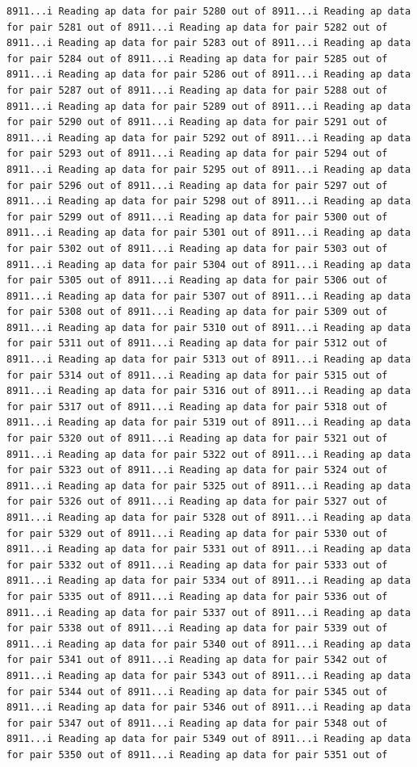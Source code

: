 \documentclass[
]{article}
\begin{document}
\begin{verbatim}
8911...i Reading ap data for pair 5280 out of 8911...i Reading ap data for pair 5281 out of 8911...i Reading ap data for pair 5282 out of 8911...i Reading ap data for pair 5283 out of 8911...i Reading ap data for pair 5284 out of 8911...i Reading ap data for pair 5285 out of 8911...i Reading ap data for pair 5286 out of 8911...i Reading ap data for pair 5287 out of 8911...i Reading ap data for pair 5288 out of 8911...i Reading ap data for pair 5289 out of 8911...i Reading ap data for pair 5290 out of 8911...i Reading ap data for pair 5291 out of 8911...i Reading ap data for pair 5292 out of 8911...i Reading ap data for pair 5293 out of 8911...i Reading ap data for pair 5294 out of 8911...i Reading ap data for pair 5295 out of 8911...i Reading ap data for pair 5296 out of 8911...i Reading ap data for pair 5297 out of 8911...i Reading ap data for pair 5298 out of 8911...i Reading ap data for pair 5299 out of 8911...i Reading ap data for pair 5300 out of 8911...i Reading ap data for pair 5301 out of 8911...i Reading ap data for pair 5302 out of 8911...i Reading ap data for pair 5303 out of 8911...i Reading ap data for pair 5304 out of 8911...i Reading ap data for pair 5305 out of 8911...i Reading ap data for pair 5306 out of 8911...i Reading ap data for pair 5307 out of 8911...i Reading ap data for pair 5308 out of 8911...i Reading ap data for pair 5309 out of 8911...i Reading ap data for pair 5310 out of 8911...i Reading ap data for pair 5311 out of 8911...i Reading ap data for pair 5312 out of 8911...i Reading ap data for pair 5313 out of 8911...i Reading ap data for pair 5314 out of 8911...i Reading ap data for pair 5315 out of 8911...i Reading ap data for pair 5316 out of 8911...i Reading ap data for pair 5317 out of 8911...i Reading ap data for pair 5318 out of 8911...i Reading ap data for pair 5319 out of 8911...i Reading ap data for pair 5320 out of 8911...i Reading ap data for pair 5321 out of 8911...i Reading ap data for pair 5322 out of 8911...i Reading ap data for pair 5323 out of 8911...i Reading ap data for pair 5324 out of 8911...i Reading ap data for pair 5325 out of 8911...i Reading ap data for pair 5326 out of 8911...i Reading ap data for pair 5327 out of 8911...i Reading ap data for pair 5328 out of 8911...i Reading ap data for pair 5329 out of 8911...i Reading ap data for pair 5330 out of 8911...i Reading ap data for pair 5331 out of 8911...i Reading ap data for pair 5332 out of 8911...i Reading ap data for pair 5333 out of 8911...i Reading ap data for pair 5334 out of 8911...i Reading ap data for pair 5335 out of 8911...i Reading ap data for pair 5336 out of 8911...i Reading ap data for pair 5337 out of 8911...i Reading ap data for pair 5338 out of 8911...i Reading ap data for pair 5339 out of 8911...i Reading ap data for pair 5340 out of 8911...i Reading ap data for pair 5341 out of 8911...i Reading ap data for pair 5342 out of 8911...i Reading ap data for pair 5343 out of 8911...i Reading ap data for pair 5344 out of 8911...i Reading ap data for pair 5345 out of 8911...i Reading ap data for pair 5346 out of 8911...i Reading ap data for pair 5347 out of 8911...i Reading ap data for pair 5348 out of 8911...i Reading ap data for pair 5349 out of 8911...i Reading ap data for pair 5350 out of 8911...i Reading ap data for pair 5351 out of 
\end{verbatim}
\end{document}

